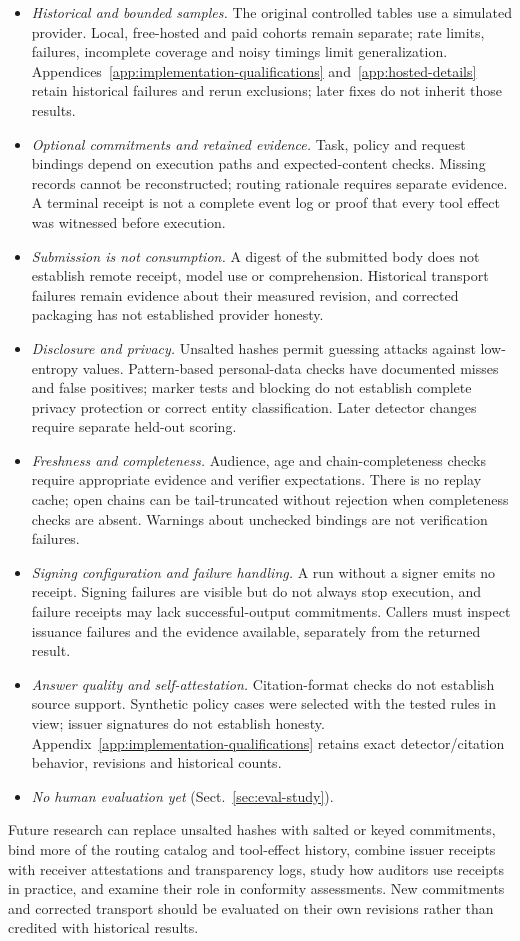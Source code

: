 \documentclass[11pt]{article}
\begin{document}
\begin{itemize}
\item \emph{Historical and bounded samples.} The original controlled tables use a simulated provider. Local, free-hosted and paid cohorts remain separate; rate limits, failures, incomplete coverage and noisy timings limit generalization. Appendices~\ref{app:implementation-qualifications} and~\ref{app:hosted-details} retain historical failures and rerun exclusions; later fixes do not inherit those results.
\item \emph{Optional commitments and retained evidence.} Task, policy and request bindings depend on execution paths and expected-content checks. Missing records cannot be reconstructed; routing rationale requires separate evidence. A terminal receipt is not a complete event log or proof that every tool effect was witnessed before execution.
\item \emph{Submission is not consumption.} A digest of the submitted body does not establish remote receipt, model use or comprehension. Historical transport failures remain evidence about their measured revision, and corrected packaging has not established provider honesty.
\item \emph{Disclosure and privacy.} Unsalted hashes permit guessing attacks against low-entropy values. Pattern-based personal-data checks have documented misses and false positives; marker tests and blocking do not establish complete privacy protection or correct entity classification. Later detector changes require separate held-out scoring.
\item \emph{Freshness and completeness.} Audience, age and chain-completeness checks require appropriate evidence and verifier expectations. There is no replay cache; open chains can be tail-truncated without rejection when completeness checks are absent. Warnings about unchecked bindings are not verification failures.
\item \emph{Signing configuration and failure handling.} A run without a signer emits no receipt. Signing failures are visible but do not always stop execution, and failure receipts may lack successful-output commitments. Callers must inspect issuance failures and the evidence available, separately from the returned result.
\item \emph{Answer quality and self-attestation.} Citation-format checks do not establish source support. Synthetic policy cases were selected with the tested rules in view; issuer signatures do not establish honesty. Appendix~\ref{app:implementation-qualifications} retains exact detector/citation behavior, revisions and historical counts.
\item \emph{No human evaluation yet} (Sect.~\ref{sec:eval-study}).
\end{itemize}
Future research can replace unsalted hashes with salted or keyed commitments, bind more of the routing catalog and tool-effect history, combine issuer receipts with receiver attestations and transparency logs, study how auditors use receipts in practice, and examine their role in conformity assessments. New commitments and corrected transport should be evaluated on their own revisions rather than credited with historical results.
\end{document}

